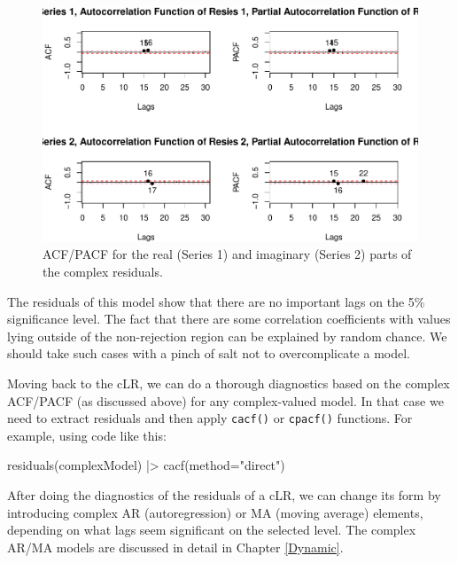 \documentclass[
]{book}
\newenvironment{Shaded}{\begin{snugshade}}{\end{snugshade}}
\newcommand{\AttributeTok}[1]{\textcolor[rgb]{0.77,0.63,0.00}{#1}}
\newcommand{\FunctionTok}[1]{\textcolor[rgb]{0.00,0.00,0.00}{#1}}
\newcommand{\NormalTok}[1]{#1}
\newcommand{\SpecialCharTok}[1]{\textcolor[rgb]{0.00,0.00,0.00}{#1}}
\newcommand{\StringTok}[1]{\textcolor[rgb]{0.31,0.60,0.02}{#1}}
\begin{document}
\begin{figure}
\centering
\includegraphics{Svetunkov---Svetunkov---Complex-Valued-Econometrics_files/figure-latex/complexARDiagnosticsACFPACF-1.pdf}
\caption{\label{fig:complexARDiagnosticsACFPACF}ACF/PACF for the real (Series 1) and imaginary (Series 2) parts of the complex residuals.}
\end{figure}

The residuals of this model show that there are no important lags on the 5\% significance level. The fact that there are some correlation coefficients with values lying outside of the non-rejection region can be explained by random chance. We should take such cases with a pinch of salt not to overcomplicate a model.

Moving back to the cLR, we can do a thorough diagnostics based on the complex ACF/PACF (as discussed above) for any complex-valued model. In that case we need to extract residuals and then apply \texttt{cacf()} or \texttt{cpacf()} functions. For example, using code like this:

\begin{Shaded}
\begin{Highlighting}[]
\FunctionTok{residuals}\NormalTok{(complexModel) }\SpecialCharTok{|\textgreater{}}
    \FunctionTok{cacf}\NormalTok{(}\AttributeTok{method=}\StringTok{"direct"}\NormalTok{)}
\end{Highlighting}
\end{Shaded}

After doing the diagnostics of the residuals of a cLR, we can change its form by introducing complex AR (autoregression) or MA (moving average) elements, depending on what lags seem significant on the selected level. The complex AR/MA models are discussed in detail in Chapter \ref{Dynamic}.
\end{document}
